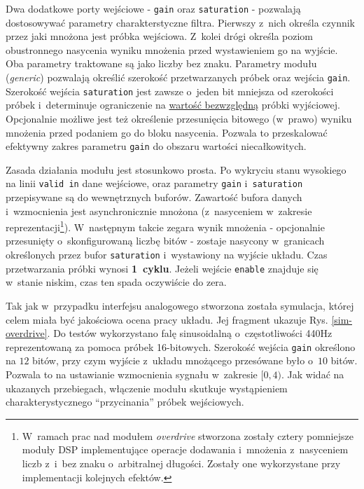 Dwa dodatkowe porty wejściowe - \verb|gain| oraz \verb|saturation| - pozwalają dostosowywać parametry charakterstyczne filtra. Pierwszy z~nich określa czynnik przez jaki mnożona jest próbka wejściowa. Z~kolei drógi określa poziom obustronnego nasycenia wyniku mnożenia przed wystawieniem go na wyjście. Oba parametry traktowane są jako liczby bez znaku. Parametry modułu (\textit{generic}) pozwalają określić szerokość przetwarzanych próbek oraz wejścia \verb|gain|. Szerokość wejścia \verb|saturation| jest zawsze o~jeden bit mniejsza od szerokości próbek i~determinuje ograniczenie na \underline{wartość bezwzględną} próbki wyjściowej. Opcjonalnie możliwe jest też określenie przesunięcia bitowego (w~prawo) wyniku mnożenia przed podaniem go do bloku nasycenia. Pozwala to przeskalować efektywny zakres parametru \verb|gain| do obszaru wartości niecałkowitych.

Zasada działania modułu jest stosunkowo prosta. Po wykryciu stanu wysokiego na linii \verb|valid in| dane wejściowe, oraz parametry \verb|gain| i~\verb|saturation| przepisywane są do wewnętrznych buforów. Zawartość bufora danych i~wzmocnienia jest asynchronicznie mnożona (z~nasyceniem w~zakresie reprezentacji\footnote{W~ramach prac nad modułem \textit{overdrive} stworzona zostały cztery pomniejsze moduły DSP implementujące operacje dodawania i~mnożenia z~nasyceniem liczb z~i~bez znaku o~arbitralnej długości. Zostały one wykorzystane przy implementacji kolejnych efektów.}). W~następnym takcie zegara wynik mnożenia - opcjonalnie przesunięty o~skonfigurowaną liczbę bitów - zostaje nasycony w~granicach określonych przez bufor \verb|saturation| i~wystawiony na wyjście układu. Czas przetwarzania próbki wynosi \textbf{1~cyklu}. Jeżeli wejście \verb|enable| znajduje się w~stanie niskim, czas ten spada oczywiście do zera. 

Tak jak w~przypadku interfejsu analogowego stworzona została symulacja, której celem miała być jakościowa ocena pracy układu. Jej fragment ukazuje Rys. \ref{sim-overdrive}. Do testów wykorzystano falę sinusoidalną o~częstotliwości 440Hz reprezentowaną za pomoca próbek 16-bitowych. Szerokość wejścia \verb|gain| określono na $12$ bitów, przy czym wyjście z~układu mnożącego przesówane było o~$10$ bitów. Pozwala to na ustawianie wzmocnienia sygnału w~zakresie $[0,4)$. Jak widać na ukazanych przebiegach, włączenie modułu skutkuje wystąpieniem charakterystycznego ``przycinania'' próbek wejściowych.

